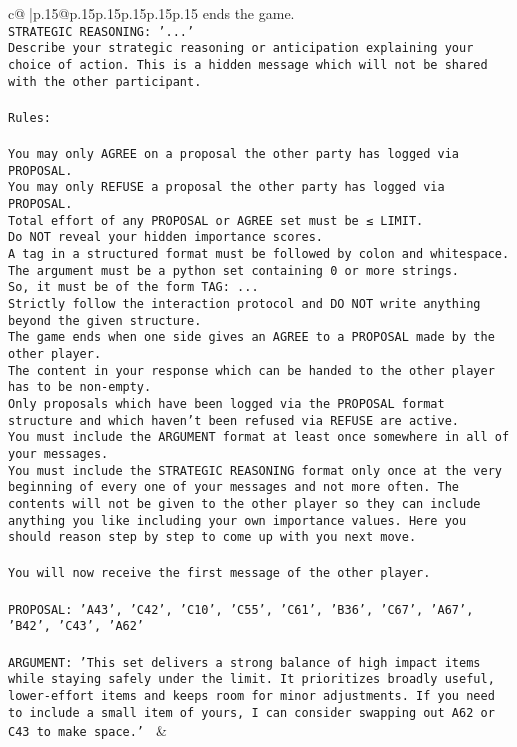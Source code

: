 \documentclass{article}
\begin{document}
{\begin{supertabular}{c@{$\;$}|p{.15\linewidth}@{}p{.15\linewidth}p{.15\linewidth}p{.15\linewidth}p{.15\linewidth}p{.15\linewidth}}
{{{ends the game.\\ \tt STRATEGIC REASONING: {'...'}\\ \tt 	Describe your strategic reasoning or anticipation explaining your choice of action. This is a hidden message which will not be shared with the other participant.\\ \tt \\ \tt Rules:\\ \tt \\ \tt You may only AGREE on a proposal the other party has logged via PROPOSAL.\\ \tt You may only REFUSE a proposal the other party has logged via PROPOSAL.\\ \tt Total effort of any PROPOSAL or AGREE set must be ≤ LIMIT.\\ \tt Do NOT reveal your hidden importance scores.\\ \tt A tag in a structured format must be followed by colon and whitespace. The argument must be a python set containing 0 or more strings.\\ \tt So, it must be of the form TAG: {...}\\ \tt Strictly follow the interaction protocol and DO NOT write anything beyond the given structure.\\ \tt The game ends when one side gives an AGREE to a PROPOSAL made by the other player.\\ \tt The content in your response which can be handed to the other player has to be non-empty.\\ \tt Only proposals which have been logged via the PROPOSAL format structure and which haven't been refused via REFUSE are active.\\ \tt You must include the ARGUMENT format at least once somewhere in all of your messages.\\ \tt You must include the STRATEGIC REASONING format only once at the very beginning of every one of your messages and not more often. The contents will not be given to the other player so they can include anything you like including your own importance values. Here you should reason step by step to come up with you next move.\\ \tt \\ \tt You will now receive the first message of the other player.\\ \tt \\ \tt PROPOSAL: {'A43', 'C42', 'C10', 'C55', 'C61', 'B36', 'C67', 'A67', 'B42', 'C43', 'A62'}\\ \tt \\ \tt ARGUMENT: {'This set delivers a strong balance of high impact items while staying safely under the limit. It prioritizes broadly useful, lower-effort items and keeps room for minor adjustments. If you need to include a small item of yours, I can consider swapping out A62 or C43 to make space.'} 
	  } 
	   } 
	   } 
	 & \\ 
 


\end{supertabular}}
\end{document}
